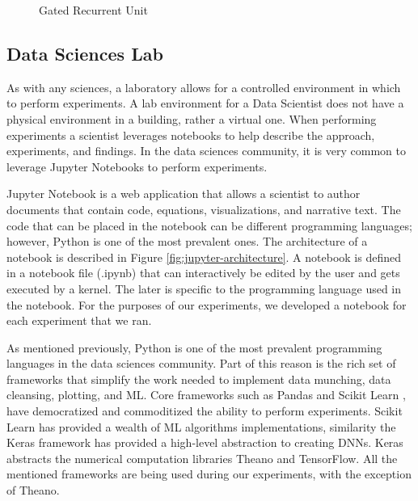 \documentclass[11pt]{article}
\begin{document}
\begin{figure}[!ht]
	\centering
	\caption{Gated Recurrent Unit\cite{ChungEmpiricalModeling}}
	\label{fig:gru-gate}
\end{figure}

\subsection{Data Sciences Lab} \label{sec:ds-lab}
As with any sciences, a laboratory allows for a controlled environment in which to perform experiments. A lab environment for a Data Scientist does not have a physical environment in a building, rather a virtual one. When performing experiments a scientist leverages notebooks to help describe the approach, experiments, and findings. In the data sciences community, it is very common to leverage Jupyter Notebooks \cite{JupyterJupyterNotebook} to perform experiments.

Jupyter Notebook is a web application that allows a scientist to author documents that contain code, equations, visualizations, and narrative text. The code that can be placed in the notebook can be different programming languages; however, Python is one of the most prevalent ones. The architecture of a notebook is described in Figure \ref{fig:jupyter-architecture}. A notebook is defined in a notebook file (.ipynb) that can interactively be edited by the user and gets executed by a kernel. The later is specific to the programming language used in the notebook. For the purposes of our experiments, we developed a notebook for each experiment that we ran.

As mentioned previously, Python is one of the most prevalent programming languages in the data sciences community. Part of this reason is the rich set of frameworks that simplify the work needed to implement data munching, data cleansing, plotting, and ML. Core frameworks such as Pandas \cite{McKinneyPythonLibrary} and Scikit Learn \cite{Scikit-learn:Documentation}, have democratized and commoditized the ability to perform experiments. Scikit Learn has provided a wealth of ML algorithms implementations, similarity the Keras \cite{CholletKeras} framework has provided a high-level abstraction to creating DNNs. Keras abstracts the numerical computation libraries Theano and TensorFlow. All the mentioned frameworks are being used during our experiments, with the exception of Theano.
\end{document}
